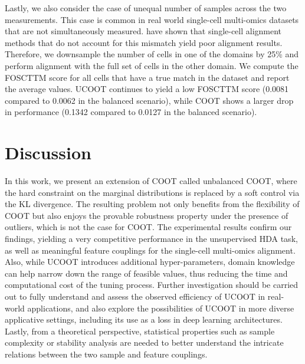 
Lastly, we also consider the case of unequal number of samples across the two measurements.
This case is common in real world single-cell multi-omics datasets that are not
simultaneously measured. \citet{Demetci22-2} have shown that
single-cell alignment methods that do not account for this mismatch yield poor alignment results.
Therefore, we downsample the number of cells in one of the domains by 25\%
and perform alignment with the full set of cells in the other domain.
We compute the FOSCTTM score for all cells that have a true match in the dataset and
report the average values. UCOOT continues to yield a low FOSCTTM score (0.0081 compared to 0.0062
in the balanced scenario), while COOT shows a larger drop in performance
(0.1342 compared to 0.0127 in the balanced scenario).

\section{Discussion}
\label{sec:conclusion}

In this work, we present an extension of COOT called unbalanced COOT,
where the hard constraint on the marginal distributions is replaced by a soft control via
the KL divergence. The resulting problem not only benefits from the flexibility of COOT
but also enjoys the provable robustness property under the presence of outliers,
which is not the case for COOT. The experimental results confirm our findings,
yielding a very competitive performance in the unsupervised HDA task, as well as
meaningful feature couplings for the single-cell multi-omics alignment. Also,
while UCOOT introduces additional hyper-parameters, domain knowledge can help narrow down
the range of feasible values, thus reducing the time and computational cost of the tuning process.
Further investigation should be carried out to fully understand and assess
the observed efficiency of UCOOT in real-world applications,
and also explore the possibilities of UCOOT in more diverse applicative settings,
including its use as a loss in deep learning architectures.
Lastly, from a theoretical perspective, statistical properties such as
sample complexity or stability analysis are needed to better understand
the intricate relations between the two sample and feature couplings.
